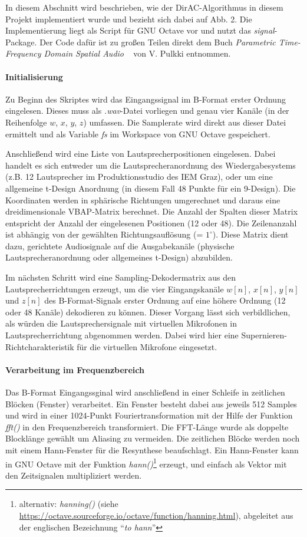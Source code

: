 In diesem Abschnitt wird beschrieben, wie der DirAC-Algorithmus in diesem Projekt implementiert wurde und bezieht sich dabei auf Abb. 2. Die Implementierung liegt als Script für GNU Octave vor und nutzt das \textit{signal}-Package. Der Code dafür ist zu großen Teilen direkt dem Buch \textit{Parametric Time-Frequency Domain Spatial Audio} ~\cite{spatial-book} von V. Pulkki entnommen.

\paragraph{Initialisierung}
Zu Beginn des Skriptes wird das Eingangssignal im B-Format erster Ordnung eingelesen. Dieses muss als \textit{.wav}-Datei vorliegen und genau vier Kanäle (in der Reihenfolge $w$, $x$, $y$, $z$) umfassen. Die Samplerate wird direkt aus dieser Datei ermittelt und als Variable \textit{fs} im Workspace von GNU Octave gespeichert.

Anschließend wird eine Liste von Lautsprecherpositionen eingelesen. Dabei handelt es sich entweder um die Lautsprecheranordnung des Wiedergabesystems (z.B. 12 Lautsprecher im Produktionsstudio des IEM Graz), oder um eine allgemeine t-Design Anordnung (in diesem Fall 48 Punkte für ein 9-Design). Die Koordinaten werden in sphärische Richtungen umgerechnet und daraus eine dreidimensionale VBAP-Matrix berechnet. Die Anzahl der Spalten dieser Matrix entspricht der Anzahl der eingelesenen Positionen (12 oder 48). Die Zeilenanzahl ist abhängig von der gewählten Richtungsauflösung (= $1^{\circ}$). Diese Matrix dient dazu, gerichtete Audiosignale auf die Ausgabekanäle (physische Lautsprecheranordnung oder allgemeines t-Design) abzubilden.

Im nächsten Schritt wird eine Sampling-Dekodermatrix \cite{ambi-book} aus den Lautsprecherrichtungen erzeugt, um die vier Eingangskanäle $w[n]$, $x[n]$, $y[n]$ und $z[n]$ des B-Format-Signals erster Ordnung auf eine höhere Ordnung (12 oder 48 Kanäle) dekodieren zu können.
Dieser Vorgang lässt sich verbildlichen, als würden die Lautsprechersignale mit virtuellen Mikrofonen in Lautsprecherrichtung abgenommen werden.
Dabei wird hier eine Supernieren-Richtcharakteristik für die virtuellen Mikrofone eingesetzt.

\paragraph{Verarbeitung im Frequenzbereich}
Das B-Format Eingangssginal wird anschließend in einer Schleife in zeitlichen Blöcken (Fenster) verarbeitet. Ein Fenster besteht dabei aus jeweils 512 Samples und wird in einer 1024-Punkt Fouriertransformation mit der Hilfe der Funktion \textit{fft()} in den Frequenzbereich transformiert. Die FFT-Länge wurde als doppelte Blocklänge gewählt um Aliasing zu vermeiden. Die zeitlichen Blöcke werden noch mit einem Hann-Fenster für die Resynthese beaufschlagt. Ein Hann-Fenster kann in GNU Octave mit der Funktion \textit{hann()}\footnote{alternativ: \textit{hanning()} (siehe \url{https://octave.sourceforge.io/octave/function/hanning.html}), abgeleitet aus der englischen Bezeichnung ``\textit{to hann}''} erzeugt, und einfach als Vektor mit den Zeitsignalen multipliziert werden.